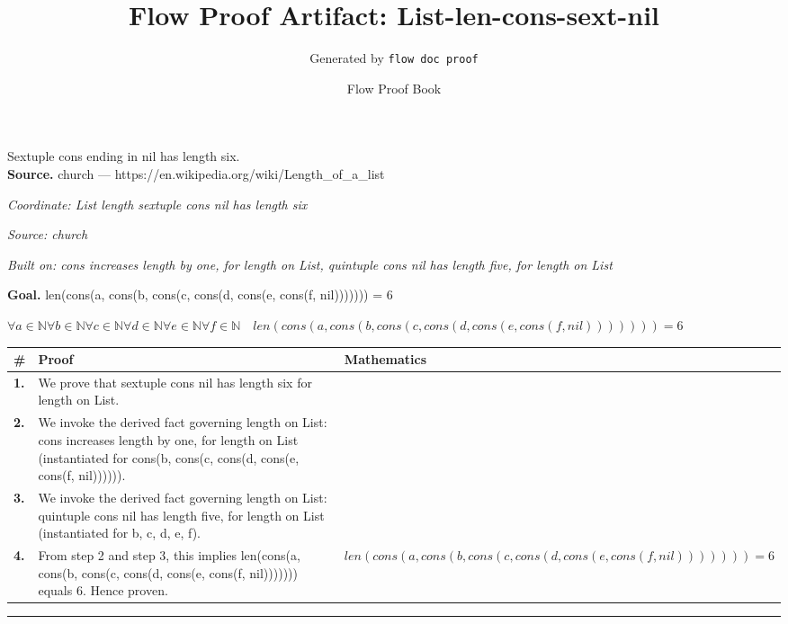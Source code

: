 \documentclass[11pt]{article}
\title{Flow Proof Artifact: List-len-cons-sext-nil}
\author{Generated by \texttt{flow doc proof}}
\date{Flow Proof Book}
\theoremstyle{definition}
\begin{document}
\maketitle
Sextuple cons ending in nil has length six.\\[0.5em]
\textbf{Source.} church — https://en.wikipedia.org/wiki/Length\_of\_a\_list\\[0.5em]
\bigskip
{}\par
\smallskip\noindent\textit{Coordinate: List \cdot length \cdot sextuple cons nil has length six}\par
\smallskip\noindent\textit{Source: church}\par
\smallskip\noindent\textit{Built on: cons increases length by one, for length on List, quintuple cons nil has length five, for length on List}\par
\medskip
\noindent\textbf{Goal.} len(cons(a, cons(b, cons(c, cons(d, cons(e, cons(f, nil))))))) = 6\par
\noindent$\displaystyle \forall a \in \mathbb{N} \forall b \in \mathbb{N} \forall c \in \mathbb{N} \forall d \in \mathbb{N} \forall e \in \mathbb{N} \forall f \in \mathbb{N}\quad len(cons(a, cons(b, cons(c, cons(d, cons(e, cons(f, nil))))))) = 6$\par
\medskip
\noindent
\begin{tabular}{@{} >{\raggedright\arraybackslash}p{} >{\raggedright\arraybackslash}p{} >{\raggedleft\arraybackslash}p{} @{}}
\textbf{\#} & \textbf{Proof} & \textbf{Mathematics} \\
\midrule
\textbf{1.} & We prove that sextuple cons nil has length six for length on List. & \\[0.45em]
\textbf{2.} & We invoke the derived fact governing length on List: cons increases length by one, for length on List (instantiated for cons(b, cons(c, cons(d, cons(e, cons(f, nil)))))). & \\[0.45em]
\textbf{3.} & We invoke the derived fact governing length on List: quintuple cons nil has length five, for length on List (instantiated for b, c, d, e, f). & \\[0.45em]
\textbf{4.} & From step 2 and step 3, this implies len(cons(a, cons(b, cons(c, cons(d, cons(e, cons(f, nil))))))) equals 6. Hence proven. & $\displaystyle len(cons(a, cons(b, cons(c, cons(d, cons(e, cons(f, nil))))))) = 6$ \\[0.45em]
\bottomrule
\end{tabular}
\label{thm:List-length-sextuple_cons_nil_has_length_six}
\par\medskip\hrule
\end{document}
